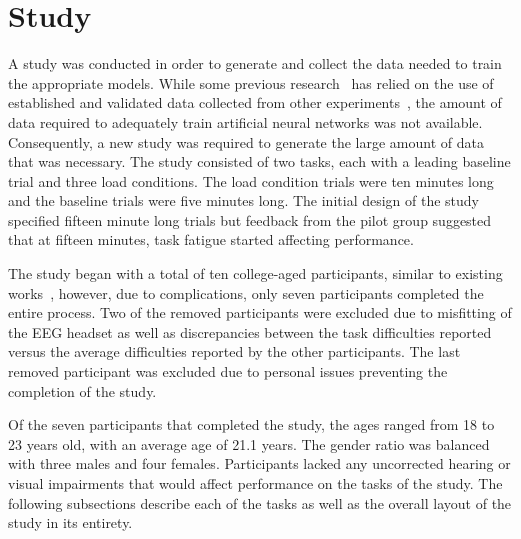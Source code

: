 \documentclass[11pt]{article}
\begin{document}
\section{Study}
A study was conducted in order to generate and collect the data needed to train the appropriate models. While some previous research~\cite{Wang_Z} has relied on the use of established and validated data collected from other experiments~\cite{Wilson_2010}, the amount of data required to adequately train artificial neural networks was not available. Consequently, a new study was required to generate the large amount of data that was necessary. The study consisted of two tasks, each with a leading baseline trial and three load conditions. The load condition trials were ten minutes long and the baseline trials were five minutes long. 
The initial design of the study specified fifteen minute long trials but feedback from the pilot group suggested that at fifteen minutes, task fatigue started affecting performance.


The study began with a total of ten college-aged participants, similar to existing works~\cite{Ting,Wang_R,Wilson_2010, Yin, Zhang}, however, due to complications, only seven participants completed the entire process. 
Two of the removed participants were excluded due to misfitting of the EEG headset as well as discrepancies between the task difficulties reported versus the average difficulties reported by the other participants. The last removed participant was excluded due to personal issues preventing the completion of the study.

Of the seven participants that completed the study, the ages ranged from 18 to 23 years old, with an average age of 21.1 years. The gender ratio was balanced with three males and four females. Participants lacked any uncorrected hearing or visual impairments that would affect performance on the tasks of the study. 
The following subsections describe each of the tasks as well as the overall layout of the study in its entirety.
	
\end{document}
